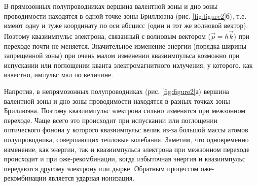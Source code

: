 \documentclass[a4paper,12pt]{article}
\begin{document}
В прямозонных полупроводниках вершина валентной зоны и дно зоны проводимости находятся в одной точке зоны Бриллюэна (рис.  \ref{fig:figure2}б), т.е. имеют одну и туже координату по оси абсцисс (один и тот же волновой вектор). Поэтому квазиимпульс электрона, связанный с волновым вектором ($\vec{p}=\hbar \vec{k}$) при переходе почти не меняется. Значительное изменение энергии (порядка ширины запрещенной зоны) при очень малом изменении квазиимпульса возможно при испускании или поглощении кванта электромагнитного излучения, у которого, как известно, импульс мал по величине.

Напротив, в непрямозонных полупроводниках (рис.  \ref{fig:figure2}а) вершина валентной зоны и дно зоны проводимости находятся в разных точках зоны Бриллюэна. Поэтому квазиимпульс электрона сильно изменятся при межзонном переходе. Чаще всего это происходит при испускании или поглощении оптического фонона у которого квазиимпульс велик из-за большой массы атомов полупроводника, совершающих тепловые колебания. Заметим, что одновременно изменение, как энергии, так и квазиимпульса электрона при межзонном переходе происходит и при оже-рекомбинации, когда избыточная энергия и квазиимпульс передаются другому электрону или дырке. Обратным процессом оже-рекомбинации является ударная ионизация.
\end{document}
